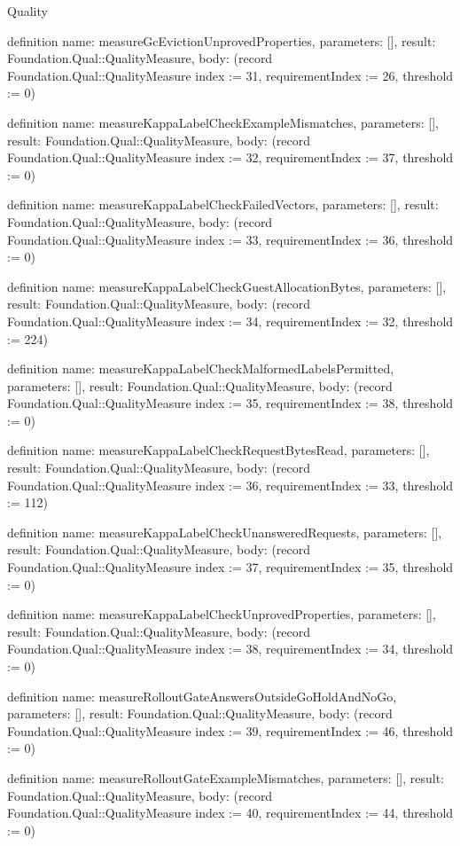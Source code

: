 \begin{lexlean}{Quality}
\begin{semanticmodule}
definition{
  name: measureGcEvictionUnprovedProperties,
  parameters: [],
  result: Foundation.Qual::QualityMeasure,
  body: (record Foundation.Qual::QualityMeasure {index := 31, requirementIndex := 26, threshold := 0})
}

definition{
  name: measureKappaLabelCheckExampleMismatches,
  parameters: [],
  result: Foundation.Qual::QualityMeasure,
  body: (record Foundation.Qual::QualityMeasure {index := 32, requirementIndex := 37, threshold := 0})
}

definition{
  name: measureKappaLabelCheckFailedVectors,
  parameters: [],
  result: Foundation.Qual::QualityMeasure,
  body: (record Foundation.Qual::QualityMeasure {index := 33, requirementIndex := 36, threshold := 0})
}

definition{
  name: measureKappaLabelCheckGuestAllocationBytes,
  parameters: [],
  result: Foundation.Qual::QualityMeasure,
  body: (record Foundation.Qual::QualityMeasure {index := 34, requirementIndex := 32, threshold := 224})
}

definition{
  name: measureKappaLabelCheckMalformedLabelsPermitted,
  parameters: [],
  result: Foundation.Qual::QualityMeasure,
  body: (record Foundation.Qual::QualityMeasure {index := 35, requirementIndex := 38, threshold := 0})
}

definition{
  name: measureKappaLabelCheckRequestBytesRead,
  parameters: [],
  result: Foundation.Qual::QualityMeasure,
  body: (record Foundation.Qual::QualityMeasure {index := 36, requirementIndex := 33, threshold := 112})
}

definition{
  name: measureKappaLabelCheckUnansweredRequests,
  parameters: [],
  result: Foundation.Qual::QualityMeasure,
  body: (record Foundation.Qual::QualityMeasure {index := 37, requirementIndex := 35, threshold := 0})
}

definition{
  name: measureKappaLabelCheckUnprovedProperties,
  parameters: [],
  result: Foundation.Qual::QualityMeasure,
  body: (record Foundation.Qual::QualityMeasure {index := 38, requirementIndex := 34, threshold := 0})
}

definition{
  name: measureRolloutGateAnswersOutsideGoHoldAndNoGo,
  parameters: [],
  result: Foundation.Qual::QualityMeasure,
  body: (record Foundation.Qual::QualityMeasure {index := 39, requirementIndex := 46, threshold := 0})
}

definition{
  name: measureRolloutGateExampleMismatches,
  parameters: [],
  result: Foundation.Qual::QualityMeasure,
  body: (record Foundation.Qual::QualityMeasure {index := 40, requirementIndex := 44, threshold := 0})
}


\end{semanticmodule}
\end{lexlean}
